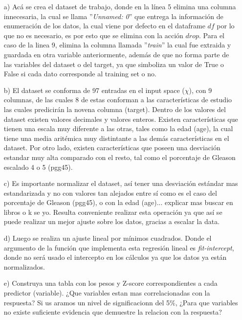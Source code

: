 \documentclass[10pt]{article}
\begin{document}
\begin{itemize}
\item[a)] Acá se crea el dataset de trabajo, donde en la línea 5 elimina una columna innecesaria, la cual se llama ''\textit{Unnamed: 0}'' que entrega la información de enumeración de los datos, la cual viene por defecto en el dataframe $df$ por lo que no es necesario, es por esto que se elimina con la acción $drop$. Para el caso de la linea 9, elimina la columna llamada ''\textit{train}'' la cual fue extraida y guardada en otra variable anteriormente, además de que no forma parte de las variables del dataset o del target, ya que simboliza un valor de True o False si cada dato corresponde al training set o no.

\item[b)] El dataset se conforma de 97 entradas en el input space ($\chi$), con 9 columnas, de las cuales 8 de estas conforman a las características de estudio las cuales predicirán la novena columna (target). Dentro de los valores del dataset existen valores decimales y valores enteros. Existen características que tienen una escala muy diferente a las otras, tales como la edad (age), la cual tiene una media aritémica muy distintante a las demás características en el dataset. Por otro lado, existen características que poseen una desviación estandar muy alta comparado con el resto, tal como el porcentaje de Gleason escalado 4 o 5 (pgg45).

\item[c)] Es importante normalizar el dataset, así tener una desviación estándar mas estandarizada y no con valores tan alejados entre sí como es el caso del porcentaje de Gleason (pgg45), o con la edad (age)... explicar mas buscar en libros o k se yo.
Resulta conveniente realizar esta operación ya que así se puede realizar un mejor ajuste  sobre los datos, gracias a escalar la data.

\item[d)] Luego se realiza un ajuste lineal por mínimos cuadrados. Donde el argumento de la función que implementa esta regresión lineal es \textit{fit-intercept}, donde no será usado el intercepto en los cálculos ya que los datos ya están normalizados.

\item[e)]Construya una tabla con los pesos y Z-score correspondientes a cada predictor (variable). ¿Que variables estan mas correlacionadas con la respuesta? Si us aramos un nivel de significacionn del 5\%, ¿Para que variables no existe suficiente evidencia que demuestre la relacion con la respuesta?


\end{itemize}
\end{document}
